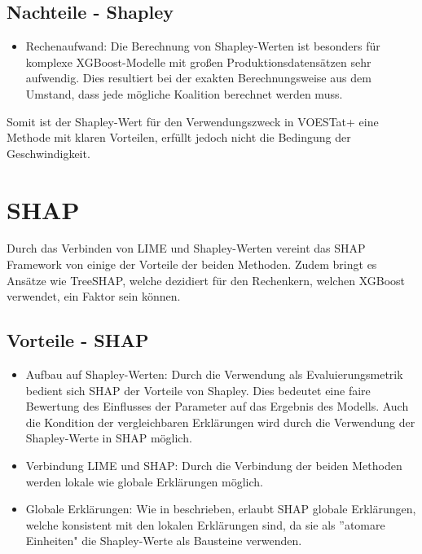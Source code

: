 \documentclass[12pt,titlepage,oneside]{book}
\begin{document}
\subsection{Nachteile - Shapley}
\begin{itemize}
    \item Rechenaufwand: Die Berechnung von Shapley-Werten ist besonders für komplexe XGBoost-Modelle mit großen Produktionsdatensätzen sehr aufwendig. Dies resultiert bei der exakten Berechnungsweise aus dem Umstand, dass jede mögliche Koalition berechnet werden muss.
\end{itemize}
Somit ist der Shapley-Wert für den Verwendungszweck in VOESTat+ eine Methode mit klaren Vorteilen, erfüllt jedoch nicht die Bedingung der Geschwindigkeit.


\newpage
\section{SHAP}
Durch das Verbinden von LIME und Shapley-Werten vereint das SHAP Framework von \cite{lundberg2017unified} einige der Vorteile der beiden Methoden. Zudem bringt es Ansätze wie TreeSHAP, welche dezidiert für den Rechenkern, welchen XGBoost verwendet, ein Faktor sein können. 
\subsection{Vorteile - SHAP}
\begin{itemize}
    \item Aufbau auf Shapley-Werten: Durch die Verwendung als Evaluierungsmetrik bedient sich SHAP der Vorteile von Shapley. Dies bedeutet eine faire Bewertung des Einflusses der Parameter auf das Ergebnis des Modells. Auch die Kondition der vergleichbaren Erklärungen wird durch die Verwendung der Shapley-Werte in SHAP möglich.
    \item Verbindung LIME und SHAP: Durch die Verbindung der beiden Methoden werden lokale wie globale Erklärungen möglich.
    \item Globale Erklärungen: Wie in \cite{molnar2020interpretable} beschrieben, erlaubt SHAP globale Erklärungen, welche konsistent mit den lokalen Erklärungen sind, da sie als ''atomare Einheiten" die Shapley-Werte als Bausteine verwenden. 
\end{itemize}
\end{document}
